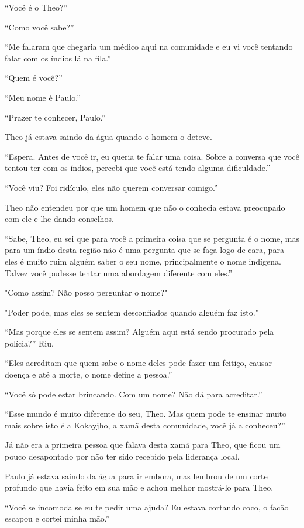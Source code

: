 ``Você é o Theo?''

``Como você sabe?''

``Me falaram que chegaria um médico aqui na comunidade e eu vi você
tentando falar com os índios lá na fila.''

``Quem é você?''

``Meu nome é Paulo.''

``Prazer te conhecer, Paulo.''

Theo já estava saindo da água quando o homem o deteve.

``Espera. Antes de você ir, eu queria te falar uma coisa. Sobre a
conversa que você tentou ter com os índios, percebi que você está tendo
alguma dificuldade.''

``Você viu? Foi ridículo, eles não querem conversar comigo.''

Theo não entendeu por que um homem que não o conhecia estava preocupado
com ele e lhe dando conselhos.

``Sabe, Theo, eu sei que para você a primeira coisa que se pergunta é o
nome, mas para um índio desta região não é uma pergunta que se faça logo
de cara, para eles é muito ruim alguém saber o seu nome, principalmente
o nome indígena. Talvez você pudesse tentar uma abordagem diferente com
eles.''

"Como assim? Não posso perguntar o nome?"

"Poder pode, mas eles se sentem desconfiados quando alguém faz isto."

``Mas porque eles se sentem assim? Alguém aqui está sendo procurado pela
polícia?'' Riu.

``Eles acreditam que quem sabe o nome deles pode fazer um feitiço,
causar doença e até a morte, o nome define a pessoa.''

``Você só pode estar brincando. Com um nome? Não dá para acreditar.''

``Esse mundo é muito diferente do seu, Theo. Mas quem pode te ensinar
muito mais sobre isto é a Kokayjho, a xamã desta comunidade, você já a
conheceu?''

Já não era a primeira pessoa que falava desta xamã para Theo, que ficou
um pouco desapontado por não ter sido recebido pela liderança local.

Paulo já estava saindo da água para ir embora, mas lembrou de um corte
profundo que havia feito em sua mão e achou melhor mostrá-lo para Theo.

``Você se incomoda se eu te pedir uma ajuda? Eu estava cortando coco, o
facão escapou e cortei minha mão.''

